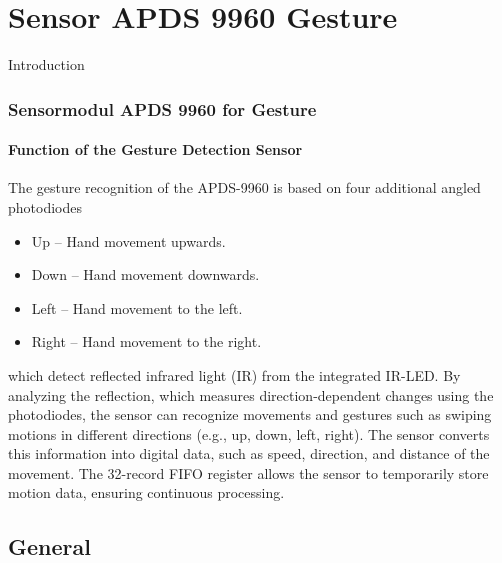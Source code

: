 %
%

\chapter{Sensor APDS 9960 Gesture}

Introduction



\subsection{Sensormodul APDS 9960 for Gesture}


\subsubsection{Function of the Gesture Detection Sensor}

The gesture recognition of the APDS-9960 is based on four additional angled photodiodes

\begin{itemize}
	
	\item Up – Hand movement upwards.
	\item Down – Hand movement downwards.
	\item Left – Hand movement to the left.
	\item Right – Hand movement to the right.
	
\end{itemize}

which detect reflected infrared light (IR) from the integrated IR-LED. By analyzing the reflection, which measures direction-dependent changes using the photodiodes, the sensor can recognize movements and gestures such as swiping motions in different directions (e.g., up, down, left, right). The sensor converts this information into digital data, such as speed, direction, and distance of the movement. The 32-record FIFO register allows the sensor to temporarily store motion data, ensuring continuous processing.
\smallskip
\cite{Avago:2015}


\section{General}

